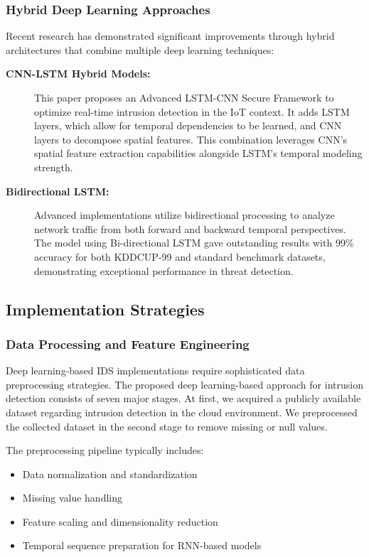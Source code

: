 \documentclass[16pt]{report}
\begin{document}
\subsubsection{Hybrid Deep Learning Approaches}
Recent research has demonstrated significant improvements through hybrid architectures that combine multiple deep learning techniques:

\begin{description}
    \item[\textbf{CNN-LSTM Hybrid Models:}] This paper proposes an Advanced LSTM-CNN Secure Framework to optimize real-time intrusion detection in the IoT context. It adds LSTM layers, which allow for temporal dependencies to be learned, and CNN layers to decompose spatial features. This combination leverages CNN's spatial feature extraction capabilities alongside LSTM's temporal modeling strength.

    \item[\textbf{Bidirectional LSTM:}] Advanced implementations utilize bidirectional processing to analyze network traffic from both forward and backward temporal perspectives. The model using Bi-directional LSTM gave outstanding results with 99\% accuracy for both KDDCUP-99 and standard benchmark datasets, demonstrating exceptional performance in threat detection.
\end{description}

\subsection{Implementation Strategies}

\subsubsection{Data Processing and Feature Engineering}
Deep learning-based IDS implementations require sophisticated data preprocessing strategies. The proposed deep learning-based approach for intrusion detection consists of seven major stages. At first, we acquired a publicly available dataset regarding intrusion detection in the cloud environment. We preprocessed the collected dataset in the second stage to remove missing or null values.

The preprocessing pipeline typically includes:
\begin{itemize}
    \item Data normalization and standardization
    \item Missing value handling
    \item Feature scaling and dimensionality reduction
    \item Temporal sequence preparation for RNN-based models
\end{itemize}
\end{document}
